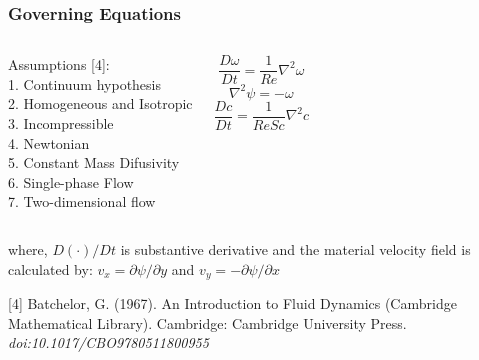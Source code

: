 \begin{frame} 
 \frametitle{\LARGE Governing Equations}
\vspace{-1.2cm}
\begin{columns}[c]
Assumptions [4]:\\[0.1cm]
\hspace{0.5cm}  1. Continuum hypothesis\\[0.1cm]
\hspace{0.5cm}  2. Homogeneous and Isotropic\\[0.1cm]
\hspace{0.5cm}  3. Incompressible\\[0.1cm]
\hspace{0.5cm}  4. Newtonian\\[0.1cm]
\hspace{0.5cm}  5. Constant Mass Difusivity\\[0.1cm]
\hspace{0.5cm}  6. Single-phase Flow\\[0.1cm]
\hspace{0.5cm}  7. Two-dimensional flow

\vspace{-1cm}
\begin{center}
\begin{equation*}
 \frac{D \omega}{Dt} = \frac{1}{Re} \nabla^{2} \omega
\end{equation*}
\medskip
\begin{equation*}
 \nabla^{2} \psi = - \omega
\end{equation*}
\medskip
\begin{equation*}
 \frac{Dc}{Dt} = \frac{1}{ReSc} \nabla^{2} c 
\end{equation*}
\end{center}
\end{columns}

\vspace{1.2cm}
\justifying
where, $D(\cdot)/Dt$ is substantive derivative and
the material velocity field is calculated by: 
$v_{x} = \partial \psi / \partial y$ and 
$v_{y} = - \partial \psi / \partial x$

\vspace{1.0cm}
\tiny [4]
Batchelor, G. (1967). An Introduction to Fluid Dynamics (Cambridge Mathematical Library). Cambridge: Cambridge University Press. \textit{doi:10.1017/CBO9780511800955}

\end{frame}



